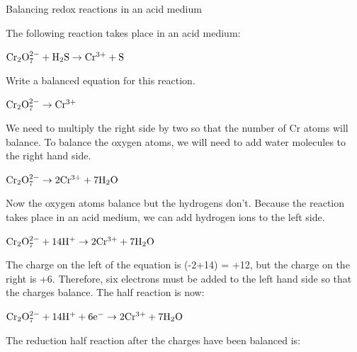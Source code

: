 \begin{wex}{Balancing redox reactions in an acid medium\\}{The following reaction takes place in an acid medium:

\begin{center}
$\rm{Cr_{2}O_{7}^{2-} + H_{2}S \rightarrow Cr^{3+} + S}$
\end{center}

Write a balanced equation for this reaction.\\}

{

\begin{center}
$\rm{Cr_{2}O_{7}^{2-} \rightarrow Cr^{3+}}$\\
\end{center}

We need to multiply the right side by two so that the number of Cr atoms will balance. To balance the oxygen atoms, we will need to add water molecules to the right hand side. 

\begin{center}
$\rm{Cr_{2}O_{7}^{2-} \rightarrow 2Cr^{3+} + 7H_{2}O}$
\end{center}

Now the oxygen atoms balance but the hydrogens don't. Because the reaction takes place in an acid medium, we can add hydrogen ions to the left side.

\begin{center}
$\rm{Cr_{2}O_{7}^{2-} + 14H^{+} \rightarrow 2Cr^{3+} + 7H_{2}O}$\\
\end{center}

The charge on the left of the equation is (-2+14) = +12, but the charge on the right is +6. Therefore, six electrons must be added to the left hand side so that the charges balance. The half reaction is now:

\begin{center}
$\rm{Cr_{2}O_{7}^{2-} + 14H^{+} + 6e^{-} \rightarrow 2Cr^{3+} + 7H_{2}O}$\\
\end{center}

The reduction half reaction after the charges have been balanced is:

}
\end{wex}
